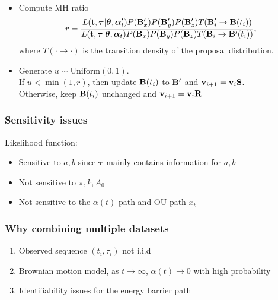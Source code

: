 \documentclass[11pt]{beamer}
\newcommand{\bit}{\begin{itemize}\setlength{\itemsep}{0cm}\setlength{\topsep}{0cm}}
\newcommand{\eit}{\end{itemize}}
\newcommand{\benum}{\begin{enumerate}\setlength{\itemsep}{0cm}\setlength{\parsep
}{0cm}}
\newcommand{\eenum}{\end{enumerate}}
\newcommand{\bB}{{\bf B}}
\newcommand{\bv}{{\bf v}}
\newcommand{\bS}{{\bf S}}
\newcommand{\balpha}{\boldsymbol{\alpha}}
\newcommand{\bR}{{\bf R}}
\newcommand{\btheta}{{\boldsymbol{\theta}}}
\newcommand{\btau}{{\boldsymbol{\tau}}}
\newcommand{\bt}{{\bf t}}
\begin{document}
\begin{frame}
\bit
	\item Compute MH ratio
						\begin{align*}\label{MH2}
						r=\dfrac{L(\bt,\btau|\btheta,\balpha'_t)P(\bB'_x)P(\bB'_y)P(\bB'_z)T(\bB_i'\rightarrow \bB(t_i))}{L(\bt,\btau|\btheta,\balpha_t)P(\bB_x)P(\bB_y)P(\bB_z)T(\bB_i\rightarrow \bB'(t_i))},
						\end{align*}
						where $T(\cdot\rightarrow\cdot)$ is the transition density of the proposal distribution. 
						\item Generate $u\sim \mbox{Uniform}(0,1)$. \\
						If $u<\min(1,r)$, then update $\bB(t_i)$ to $\bB'$ and $\bv_{i+1}=\bv_i\bS$.\\
						Otherwise, keep $\bB(t_i)$ unchanged and $\bv_{i+1}=\bv_i\bR$
\eit
\end{frame}
\begin{frame}
\frametitle{Sensitivity issues}
Likelihood function: 
\bit
\item Sensitive to $a,b$ since $\btau$ mainly contains information for $a,b$
\item Not sensitive to $\pi,k,A_0$
\item Not sensitive to the $\alpha(t)$ path and OU path $x_t$
\eit
\end{frame}
\begin{frame}
\frametitle{Why combining multiple datasets}
\benum
\item Observed sequence $(t_i,\tau_i)$ not i.i.d
\item Brownian motion model, as $t\rightarrow \infty$, $\alpha(t)\rightarrow 0$ with high probability
\item Identifiability issues for the energy barrier path 
\eenum
\end{frame}
	
\end{document}
